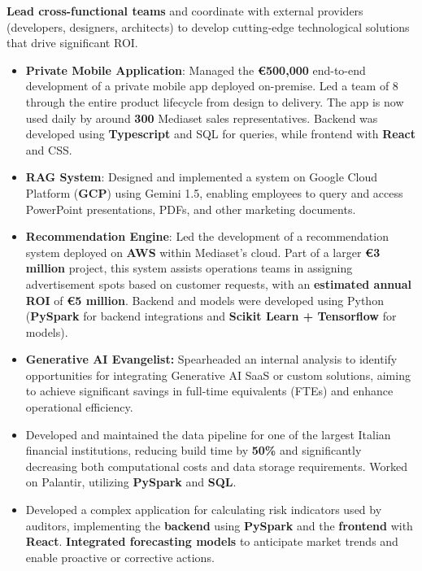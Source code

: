 \documentclass[10pt,a4paper]{altacv}
\begin{document}

     \textbf{Lead cross-functional teams} and coordinate with external providers (developers, designers, architects) to develop cutting-edge technological solutions that drive significant ROI.
     \begin{itemize}
        \item \textbf{Private Mobile Application}: Managed the \textbf{€500,000} end-to-end development of a private mobile app deployed on-premise. Led a team of 8 through the entire product lifecycle from design to delivery. The app is now used daily by around \textbf{300} Mediaset sales representatives. Backend was developed using \textbf{Typescript} and SQL for queries, while frontend with \textbf{React} and CSS.
        \item \textbf{RAG System}: Designed and implemented a system on Google Cloud Platform (\textbf{GCP}) using Gemini 1.5, enabling employees to query and access PowerPoint presentations, PDFs, and other marketing documents.
        \item \textbf{Recommendation Engine}: Led the development of a recommendation system deployed on \textbf{AWS} within Mediaset’s cloud. Part of a larger \textbf{€3 million} project, this system assists operations teams in assigning advertisement spots based on customer requests, with an \textbf{estimated annual ROI} of \textbf{€5 million}. Backend and models were developed using Python (\textbf{PySpark} for backend integrations and \textbf{Scikit Learn + Tensorflow} for models).
        \item \textbf{Generative AI Evangelist:} Spearheaded an internal analysis to identify opportunities for integrating Generative AI SaaS or custom solutions, aiming to achieve significant savings in full-time equivalents (FTEs) and enhance operational efficiency.
     \end{itemize}


    \begin{itemize}
        \item Developed and maintained the data pipeline for one of the largest Italian financial institutions, reducing build time by \textbf{50\%} and significantly decreasing both computational costs and data storage requirements. Worked on Palantir, utilizing \textbf{PySpark} and \textbf{SQL}.
    \end{itemize}
    \begin{itemize}
        \item Developed a complex application for calculating risk indicators used by auditors, implementing the \textbf{backend} using \textbf{PySpark} and the \textbf{frontend} with \textbf{React}. \textbf{Integrated forecasting models} to anticipate market trends and enable proactive or corrective actions.
    \end{itemize}
\end{document}

